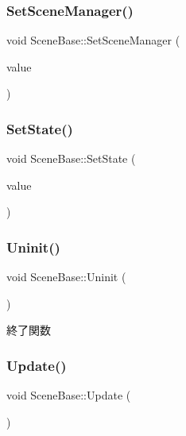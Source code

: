 \subsubsection{\texorpdfstring{Set\+Scene\+Manager()}{SetSceneManager()}}
{\footnotesize\ttfamily void Scene\+Base\+::\+Set\+Scene\+Manager (\begin{DoxyParamCaption}\item[{\mbox{\hyperlink{class_scene_manager}{Scene\+Manager}} $\ast$}]{value }\end{DoxyParamCaption})\hspace{0.3cm}{\ttfamily [inline]}}

\mbox{\label{class_scene_base_ad2ca7b31e693a4cb2cb7ebb69f61bae2}} 
\subsubsection{\texorpdfstring{Set\+State()}{SetState()}}
{\footnotesize\ttfamily void Scene\+Base\+::\+Set\+State (\begin{DoxyParamCaption}\item[{\mbox{\hyperlink{class_scene_base_1_1_state_abstract}{State\+Abstract}} $\ast$}]{value }\end{DoxyParamCaption})\hspace{0.3cm}{\ttfamily [inline]}}

\mbox{\label{class_scene_base_aa4babf42cf2c2b6e17bb3ddd6ff13d31}} 
\subsubsection{\texorpdfstring{Uninit()}{Uninit()}}
{\footnotesize\ttfamily void Scene\+Base\+::\+Uninit (\begin{DoxyParamCaption}{ }\end{DoxyParamCaption})}



終了関数 

\mbox{\label{class_scene_base_a71f332a32d99548b3aa912210a2dd0b0}} 
\subsubsection{\texorpdfstring{Update()}{Update()}}
{\footnotesize\ttfamily void Scene\+Base\+::\+Update (\begin{DoxyParamCaption}{ }\end{DoxyParamCaption})}



